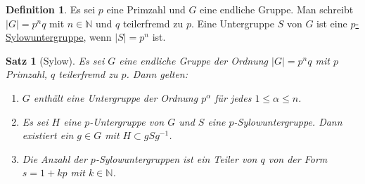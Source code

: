 \documentclass[12pt]{scrartcl} %
\newtheorem{thm}{Satz}
\theoremstyle{definition}
\newtheorem*{defn}{Definition}
\theoremstyle{remark}
\newcommand{\defi}{\underline}
\begin{document}
\begin{defn}
	Es sei \(p\) eine Primzahl und \(G\) eine endliche Gruppe.
	Man schreibt $|G|=p^n q$ mit $n \in \mathbb{N}$ und \(q\) teilerfremd zu \(p\).
	Eine Untergruppe \(S\) von \(G\) ist eine \defi{\(p\)-Sylowuntergruppe}, wenn $|S|=p^n$ ist.
\end{defn}

\begin{thm}[Sylow]
	Es sei \(G\) eine endliche Gruppe der Ordnung $|G|=p^n q$ mit \(p\) Primzahl, \(q\) teilerfremd zu \(p\).
	Dann gelten:
	\begin{enumerate}
	\item \(G\) enthält eine Untergruppe der Ordnung $p^\alpha$ für jedes $1\leq \alpha \leq n$. %
	\item Es sei \(H\) eine \(p\)-Untergruppe von \(G\) und \(S\) eine \(p\)-Sylowuntergruppe.
		Dann existiert ein $g \in G$ mit $H \subset gSg^{-1}$.
	\item Die Anzahl der \(p\)-Sylowuntergruppen ist ein Teiler von \(q\) von der Form $s=1+kp$ mit $k \in \mathbb{N}$.
	\end{enumerate}
\end{thm}
\end{document}
